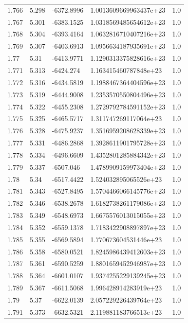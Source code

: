 \begin{tabular}{lllll}
1.766 & 5.298 & -6372.8996 & 1.0013609669963437e+23 & 1.0 \\
1.767 & 5.301 & -6383.1525 & 1.0318569485654612e+23 & 1.0 \\
1.768 & 5.304 & -6393.4164 & 1.0632816710407216e+23 & 1.0 \\
1.769 & 5.307 & -6403.6913 & 1.0956634187935691e+23 & 1.0 \\
1.77 & 5.31 & -6413.9771 & 1.1290313375828616e+23 & 1.0 \\
1.771 & 5.313 & -6424.274 & 1.163415460787848e+23 & 1.0 \\
1.772 & 5.316 & -6434.5819 & 1.1988467364404596e+23 & 1.0 \\
1.773 & 5.319 & -6444.9008 & 1.2353570550804496e+23 & 1.0 \\
1.774 & 5.322 & -6455.2308 & 1.2729792784591152e+23 & 1.0 \\
1.775 & 5.325 & -6465.5717 & 1.311747269117064e+23 & 1.0 \\
1.776 & 5.328 & -6475.9237 & 1.3516959208628339e+23 & 1.0 \\
1.777 & 5.331 & -6486.2868 & 1.3928611901795728e+23 & 1.0 \\
1.778 & 5.334 & -6496.6609 & 1.4352801285884342e+23 & 1.0 \\
1.779 & 5.337 & -6507.046 & 1.4789909159973404e+23 & 1.0 \\
1.78 & 5.34 & -6517.4422 & 1.524032895065526e+23 & 1.0 \\
1.781 & 5.343 & -6527.8495 & 1.5704466066145776e+23 & 1.0 \\
1.782 & 5.346 & -6538.2678 & 1.6182738261179086e+23 & 1.0 \\
1.783 & 5.349 & -6548.6973 & 1.6675576013015055e+23 & 1.0 \\
1.784 & 5.352 & -6559.1378 & 1.7183422908897897e+23 & 1.0 \\
1.785 & 5.355 & -6569.5894 & 1.770673604531446e+23 & 1.0 \\
1.786 & 5.358 & -6580.0521 & 1.8245986439412603e+23 & 1.0 \\
1.787 & 5.361 & -6590.5259 & 1.8801659452946987e+23 & 1.0 \\
1.788 & 5.364 & -6601.0107 & 1.9374255229139245e+23 & 1.0 \\
1.789 & 5.367 & -6611.5068 & 1.996428914283919e+23 & 1.0 \\
1.79 & 5.37 & -6622.0139 & 2.057229226439764e+23 & 1.0 \\
1.791 & 5.373 & -6632.5321 & 2.119881183766513e+23 & 1.0 \\

\end{tabular}
